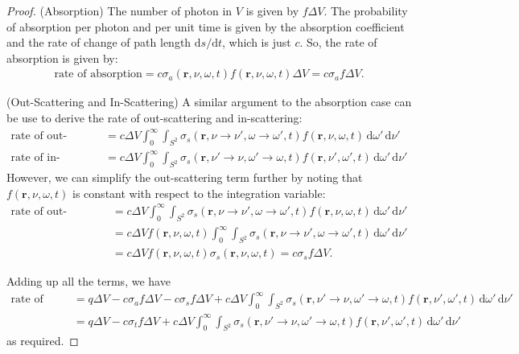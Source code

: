 \documentclass[10pt]{article}
\newcommand{\dee}{\mathrm{d}}
\newcommand{\ve}[1]{\mathbf{#1}}
\newcommand{\ra}{\rightarrow}
\begin{document}
\begin{itemize}
\begin{proof}
      (Absorption) The number of photon in $V$ is given by $f \Delta V$. The probability of absorption per photon and per unit time is given by the absorption coefficient and the rate of change of path length $\dee s / \dee t$, which is just $c$. So, the rate of absorption is given by:
      \begin{align*}
        \mbox{rate of absorption} = c \sigma_a(\ve{r}, \nu, \omega, t) f(\ve{r}, \nu, \omega, t) \Delta V = c \sigma_a f \Delta V.
      \end{align*}

      (Out-Scattering and In-Scattering) A similar argument to the absorption case can be use to derive the rate of out-scattering and in-scattering:
      \begin{align*}
        \mbox{rate of out-scattering} &= c \Delta V \int_{0}^\infty \int_{S^2} \sigma_s(\ve{r}, \nu \ra \nu', \omega \ra \omega', t) f(\ve{r}, \nu, \omega, t)\, \dee \omega'\, \dee \nu' \\
        \mbox{rate of in-scattering} &= c \Delta V \int_{0}^\infty \int_{S^2} \sigma_s(\ve{r}, \nu' \ra \nu, \omega' \ra \omega, t) f(\ve{r}, \nu', \omega', t)\, \dee \omega'\, \dee \nu'
      \end{align*}
      However, we can simplify the out-scattering term further by noting that $f(\ve{r},\nu,\omega,t)$ is constant with respect to the integration variable:
      \begin{align*}
        \mbox{rate of out-scattering} 
        &= c \Delta V \int_{0}^\infty \int_{S^2} \sigma_s(\ve{r}, \nu \ra \nu', \omega \ra \omega', t) f(\ve{r}, \nu, \omega, t)\, \dee \omega'\, \dee \nu'\\
        &= c \Delta V f(\ve{r}, \nu, \omega, t) \int_{0}^\infty \int_{S^2} \sigma_s(\ve{r}, \nu \ra \nu', \omega \ra \omega', t)\, \dee \omega'\, \dee \nu'\\
        &= c \Delta V f(\ve{r}, \nu, \omega, t) \sigma_s(\ve{r}, \nu, \omega, t)
        = c \sigma_s f \Delta V.
      \end{align*}

      Adding up all the terms, we have
      \begin{align*}
        \mbox{rate of interaction} 
        &= q\Delta V - c \sigma_a f \Delta V - c\sigma_s f \Delta V + c \Delta V \int_{0}^\infty \int_{S^2} \sigma_s(\ve{r}, \nu' \ra \nu, \omega' \ra \omega, t) f(\ve{r}, \nu', \omega', t)\, \dee \omega'\, \dee \nu'\\
        &= q\Delta V - c \sigma_t f \Delta V + c \Delta V \int_{0}^\infty \int_{S^2} \sigma_s(\ve{r}, \nu' \ra \nu, \omega' \ra \omega, t) f(\ve{r}, \nu', \omega', t)\, \dee \omega'\, \dee \nu'
      \end{align*}
      as required.
    \end{proof}
    
  \end{itemize}
\end{document}
